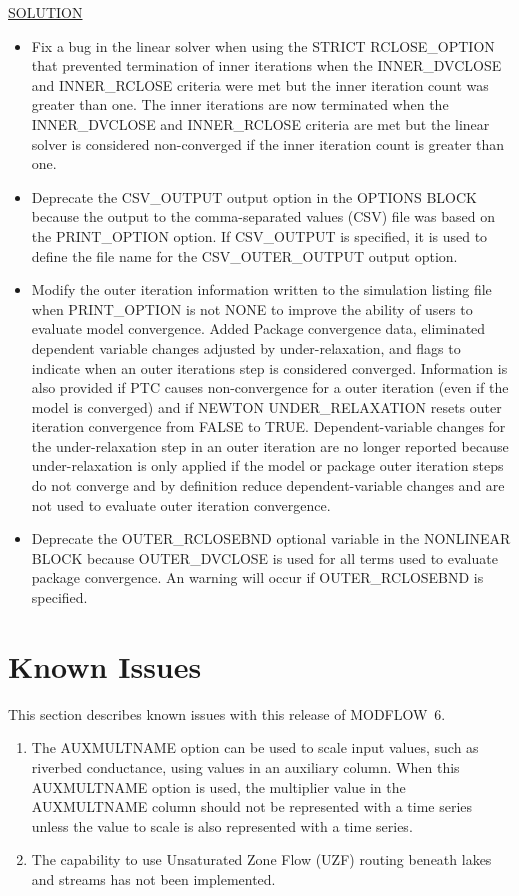 \documentclass[11pt,twoside,twocolumn]{usgsreport}
\begin{document}
\begin{itemize}
	\underline{SOLUTION}
	\begin{itemize}
		\item Fix a bug in the linear solver when using the STRICT RCLOSE\_OPTION that prevented termination of inner iterations when the INNER\_DVCLOSE and INNER\_RCLOSE criteria were met but the inner iteration count was greater than one. The inner iterations are now terminated when the INNER\_DVCLOSE and INNER\_RCLOSE criteria are met but the linear solver is considered non-converged if the inner iteration count is greater than one.
		\item Deprecate the CSV\_OUTPUT output option in the OPTIONS BLOCK because the output to the comma-separated values (CSV) file was based on the PRINT\_OPTION option. If CSV\_OUTPUT is specified, it is used to define the file name for the CSV\_OUTER\_OUTPUT output option.
		\item Modify the outer iteration information written to the simulation listing file when PRINT\_OPTION is not NONE to improve the ability of users to evaluate model convergence. Added Package convergence data, eliminated dependent variable changes adjusted by under-relaxation, and flags to indicate when an outer iterations step is considered converged. Information is also provided if PTC causes non-convergence for a outer iteration (even if the model is converged) and if NEWTON UNDER\_RELAXATION resets outer iteration convergence from FALSE to TRUE. Dependent-variable changes for the under-relaxation step in an outer iteration are no longer reported because under-relaxation is only applied if the model or package outer iteration steps do not converge and by definition reduce dependent-variable changes and are not used to evaluate outer iteration convergence.
		\item Deprecate the OUTER\_RCLOSEBND optional variable in the NONLINEAR BLOCK because OUTER\_DVCLOSE is used for all terms used to evaluate package convergence. An warning will occur if OUTER\_RCLOSEBND is specified.
	\end{itemize}

\end{itemize}


\section{Known Issues}
This section describes known issues with this release of MODFLOW~6.

\begin{enumerate}

\item
The AUXMULTNAME option can be used to scale input values, such as riverbed conductance, using values in an auxiliary column.  When this AUXMULTNAME option is used, the multiplier value in the AUXMULTNAME column should not be represented with a time series unless the value to scale is also represented with a time series.  

\item
The capability to use Unsaturated Zone Flow (UZF) routing beneath lakes and streams has not been implemented.

\end{enumerate}
\end{document}
